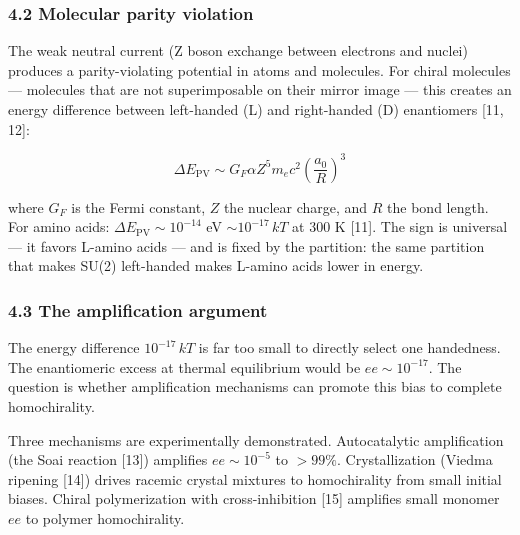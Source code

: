 \documentclass[
]{article}
\begin{document}
\hypertarget{molecular-parity-violation}{%
\subsubsection{4.2 Molecular parity
violation}\label{molecular-parity-violation}}

The weak neutral current (Z boson exchange between electrons and nuclei)
produces a parity-violating potential in atoms and molecules. For chiral
molecules --- molecules that are not superimposable on their mirror
image --- this creates an energy difference between left-handed (L) and
right-handed (D) enantiomers {[}11, 12{]}:

\[\Delta E_{\text{PV}} \sim G_F \alpha Z^5 m_e c^2 \left(\frac{a_0}{R}\right)^3\]

where \(G_F\) is the Fermi constant, \(Z\) the nuclear charge, and \(R\)
the bond length. For amino acids: \(\Delta E_{\text{PV}} \sim 10^{-14}\)
eV \(\sim 10^{-17} \, kT\) at 300 K {[}11{]}. The sign is universal ---
it favors L-amino acids --- and is fixed by the partition: the same
partition that makes SU(2) left-handed makes L-amino acids lower in
energy.

\hypertarget{the-amplification-argument}{%
\subsubsection{4.3 The amplification
argument}\label{the-amplification-argument}}

The energy difference \(10^{-17} \, kT\) is far too small to directly
select one handedness. The enantiomeric excess at thermal equilibrium
would be \(ee \sim 10^{-17}\). The question is whether amplification
mechanisms can promote this bias to complete homochirality.

Three mechanisms are experimentally demonstrated. Autocatalytic
amplification (the Soai reaction {[}13{]}) amplifies \(ee \sim 10^{-5}\)
to \(> 99\%\). Crystallization (Viedma ripening {[}14{]}) drives racemic
crystal mixtures to homochirality from small initial biases. Chiral
polymerization with cross-inhibition {[}15{]} amplifies small monomer
\(ee\) to polymer homochirality.
\end{document}
